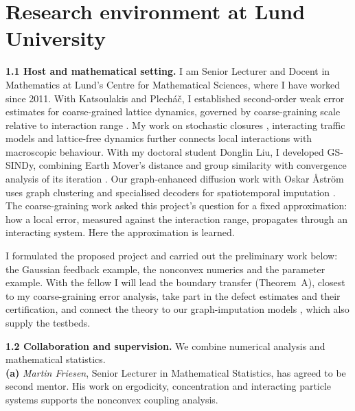 \documentclass[12pt,a4paper]{article}
\begin{document}
\section{Research environment at Lund University}
\textbf{1.1 Host and mathematical setting.}
I am Senior Lecturer and Docent in Mathematics at Lund's Centre for Mathematical Sciences, where I have worked since 2011. With Katsoulakis and Plech\'a\v{c}, I established second-order weak error estimates for coarse-grained lattice dynamics, governed by coarse-graining scale relative to interaction range \cite{KPS06}. My work on stochastic closures \cite{KMS05}, interacting traffic models \cite{SK06} and lattice-free dynamics \cite{Sop12} further connects local interactions with macroscopic behaviour. With my doctoral student Donglin Liu, I developed GS-SINDy, combining Earth Mover's distance and group similarity with convergence analysis of its iteration \cite{LS25}. Our graph-enhanced diffusion work with Oskar \AA{}str\"om uses graph clustering and specialised decoders for spatiotemporal imputation \cite{LAS25}. 
The coarse-graining work asked this project's question for a fixed approximation: how a local error, measured against the interaction range, propagates through an interacting system. Here the approximation is learned.

I formulated the proposed project and carried out the preliminary work below: the Gaussian feedback example, the nonconvex numerics and the parameter example. With the fellow I will lead the boundary transfer (Theorem~A), closest to my coarse-graining error analysis, take part in the defect estimates and their certification, and connect the theory to our graph-imputation models \cite{LAS25}, which also supply the testbeds.

\textbf{1.2 Collaboration and supervision.}
We combine numerical analysis and mathematical statistics.\\
\noindent\textbf{(a)} \textit{Martin Friesen}, Senior Lecturer in Mathematical Statistics, has agreed to be second mentor. His work on ergodicity, concentration and interacting particle systems supports the nonconvex coupling analysis.
\end{document}
